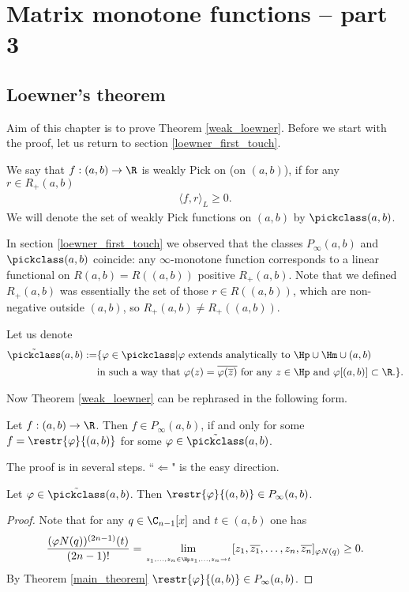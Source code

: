 \chapter{Matrix monotone functions -- part 3}

\section{Loewner's theorem}

Aim of this chapter is to prove Theorem \ref{weak_loewner}. Before we start with the proof, let us return to section \ref{loewner_first_touch}.

\begin{maar}
	We say that $f : (a, b) \to \R$ is weakly Pick on (on $(a, b)$), if for any $r \in R_{+}(a, b)$
	\begin{align*}
		\langle f, r\rangle_{L} \geq 0.
	\end{align*}
	We will denote the set of weakly Pick functions on $(a, b)$ by $\pickclass(a, b)$.
\end{maar}

In section \ref{loewner_first_touch} we observed that the classes $P_{\infty}(a, b)$ and  $\pickclass(a, b)$ coincide: any $\infty$-monotone function corresponds to a linear functional on $R(a, b) = R((a, b))$ positive $R_{+}(a, b)$. Note that we defined $R_{+}(a, b)$ was essentially the set of those $r \in R((a, b))$, which are non-negative outside $(a, b)$, so $R_{+}(a, b) \neq R_{+}((a, b))$.

Let us denote
\begin{align*}
	\tilde{\pickclass}(a, b) :=& \{\varphi \in \pickclass | \text{$\varphi$ extends analytically to $\Hp \cup \Hm \cup (a, b)$} \\
	&\text{in such a way that $\varphi(z) = \overline{\varphi(\overline{z})}$ for any $z \in \Hp$ and $\varphi[(a, b)] \subset \R.$}\}.
\end{align*}

Now Theorem \ref{weak_loewner} can be rephrased in the following form.
\begin{lause}\label{better_weak_loewner}
	Let $f : (a, b) \to \R$. Then $f \in P_{\infty}(a, b)$, if and only for some $f = \restr{\varphi}{(a, b)}$ for some $\varphi \in \tilde{\pickclass}(a, b)$.
\end{lause}

The proof is in several steps. ``$\Leftarrow$" is the easy direction.
\begin{lem}\label{loewner_easy}
	Let $\varphi \in \tilde{\pickclass}(a, b)$. Then $\restr{\varphi}{(a, b)} \in P_{\infty}(a, b)$.
\end{lem}
\begin{proof}
	Note that for any $q \in \C_{n - 1}[x]$ and $t \in (a, b)$ one has
	\begin{align*}
		\frac{(\varphi N(q))^{(2 n - 1)}(t)}{(2 n - 1)!} = \lim_{\atop{z_{1}, \ldots, z_{n} \in \Hp}{z_{1}, \ldots, z_{n} \to t}} [z_{1}, \overline{z_{1}}, \ldots, z_{n}, \overline{z_{n}}]_{\varphi N(q)} \geq 0.
	\end{align*}
	By Theorem \ref{main_theorem} $\restr{\varphi}{(a, b)} \in P_{\infty}(a, b)$.
\end{proof}

